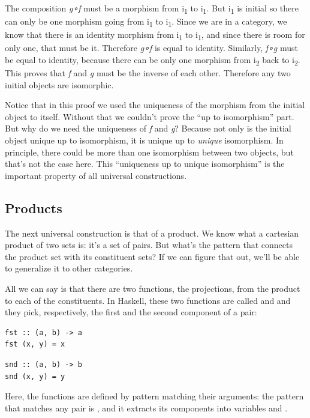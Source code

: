 The composition \emph{g∘f} must be a morphism from i\textsubscript{1} to
i\textsubscript{1}. But i\textsubscript{1} is initial so there can only
be one morphism going from i\textsubscript{1} to i\textsubscript{1}.
Since we are in a category, we know that there is an identity morphism
from i\textsubscript{1} to i\textsubscript{1}, and since there is room
for only one, that must be it. Therefore \emph{g∘f} is equal to
identity. Similarly, \emph{f∘g} must be equal to identity, because there
can be only one morphism from i\textsubscript{2} back to
i\textsubscript{2}. This proves that \emph{f} and \emph{g} must be the
inverse of each other. Therefore any two initial objects are isomorphic.

Notice that in this proof we used the uniqueness of the morphism from
the initial object to itself. Without that we couldn't prove the ``up to
isomorphism'' part. But why do we need the uniqueness of \emph{f} and
\emph{g}? Because not only is the initial object unique up to
isomorphism, it is unique up to \emph{unique} isomorphism. In principle,
there could be more than one isomorphism between two objects, but that's
not the case here. This ``uniqueness up to unique isomorphism'' is the
important property of all universal constructions.

\subsection{Products}\label{products}

The next universal construction is that of a product. We know what a
cartesian product of two sets is: it's a set of pairs. But what's the
pattern that connects the product set with its constituent sets? If we
can figure that out, we'll be able to generalize it to other categories.

All we can say is that there are two functions, the projections, from
the product to each of the constituents. In Haskell, these two functions
are called  and  and they pick, respectively,
the first and the second component of a pair:

\begin{verbatim}
fst :: (a, b) -> a
fst (x, y) = x
\end{verbatim}

\begin{verbatim}
snd :: (a, b) -> b
snd (x, y) = y
\end{verbatim}

Here, the functions are defined by pattern matching their arguments: the
pattern that matches any pair is , and it extracts its
components into variables  and .

